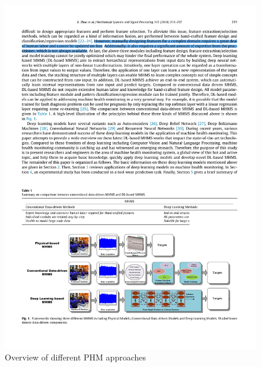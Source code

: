 \begin{figure}[H]
  \centering
  \includegraphics[width=1\textwidth]{hand_crafted_features_physical_models_deep_learning.pdf}
  \caption {Overview of different PHM approaches \cite{ZHAO2019213}} \label{fig:hand_crafted_features_physical_models_deep_learning}
\end{figure}